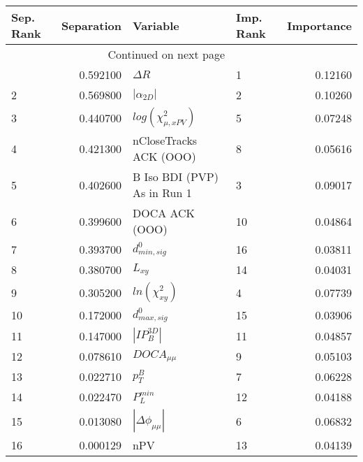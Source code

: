 \usepackage{lscape}

\begin{landscape}
\begin{longtable}{lrllr}
\toprule
Sep. Rank &  Separation &                     Variable & Imp. Rank &  Importance \\
\midrule
\endhead
\midrule
\multicolumn{3}{r}{{Continued on next page}} \\
\midrule
\endfoot

\bottomrule
\endlastfoot
        1 &    0.592100 &                   $\Delta R$ &         1 &     0.12160 \\
        2 &    0.569800 &              $|\alpha_{2D}|$ &         2 &     0.10260 \\
        3 &    0.440700 &    $log(\chi^{2}_{\mu,xPV})$ &         5 &     0.07248 \\
        4 &    0.421300 &       nCloseTracks ACK (OOO) &         8 &     0.05616 \\
        5 &    0.402600 &  B Iso BDI (PVP) As in Run 1 &         3 &     0.09017 \\
        6 &    0.399600 &               DOCA ACK (OOO) &        10 &     0.04864 \\
        7 &    0.393700 &             $d^0_{min, sig}$ &        16 &     0.03811 \\
        8 &    0.380700 &                     $L_{xy}$ &        14 &     0.04031 \\
        9 &    0.305200 &          $ln(\chi^{2}_{xy})$ &         4 &     0.07739 \\
       10 &    0.172000 &             $d^0_{max, sig}$ &        15 &     0.03906 \\
       11 &    0.147000 &              $|IP_{B}^{3D}|$ &        11 &     0.04857 \\
       12 &    0.078610 &              $DOCA_{\mu\mu}$ &         9 &     0.05103 \\
       13 &    0.022710 &                    $p^B_{T}$ &         7 &     0.06228 \\
       14 &    0.022470 &                $P^{min}_{L}$ &        12 &     0.04188 \\
       15 &    0.013080 &     $|\Delta \phi_{\mu\mu}|$ &         6 &     0.06832 \\
       16 &    0.000129 &                          nPV &        13 &     0.04139 \\
\end{longtable}

\end{landscape}
